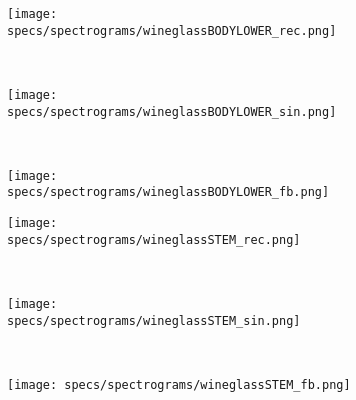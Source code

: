 \begin{figure}
	\centering      
    \begin{subfigure}[b]{0.25\textwidth}
        \texttt{[image: specs/spectrograms/wineglassBODYLOWER\_rec.png]}
    \end{subfigure}%
    ~ %
    \begin{subfigure}[b]{0.25\textwidth}
        \texttt{[image: specs/spectrograms/wineglassBODYLOWER\_sin.png]}
    \end{subfigure}%
    ~ %
    \begin{subfigure}[b]{0.25\textwidth}
        \texttt{[image: specs/spectrograms/wineglassBODYLOWER\_fb.png]}
    \end{subfigure}%
      
    \begin{subfigure}[b]{0.25\textwidth}
        \texttt{[image: specs/spectrograms/wineglassSTEM\_rec.png]}
    \end{subfigure}%
    ~ %
    \begin{subfigure}[b]{0.25\textwidth}
        \texttt{[image: specs/spectrograms/wineglassSTEM\_sin.png]}
    \end{subfigure}%
    ~ %
    \begin{subfigure}[b]{0.25\textwidth}
        \texttt{[image: specs/spectrograms/wineglassSTEM\_fb.png]}
    \end{subfigure}%
      

\end{figure}

